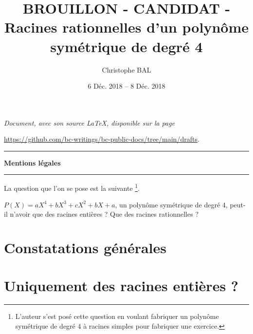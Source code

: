 \documentclass[12pt]{amsart}
\begin{document}
\title{BROUILLON - CANDIDAT - Racines rationnelles d'un polynôme symétrique de degré 4}
\author{Christophe BAL}
\date{6 Déc. 2018 -- 8 Déc. 2018}
\maketitle



\begin{center}
	\itshape
	Document, avec son source \LaTeX, disponible sur la page

	\url{https://github.com/bc-writings/bc-public-docs/tree/main/drafts}.
\end{center}


\bigskip


\begin{center}
	\hrule\vspace{.3em}
	{
		\fontsize{1.35em}{1em}\selectfont
		\textbf{Mentions \og légales \fg}
	}

	\vspace{0.45em}
	\doclicenseThis
	\hrule
\end{center}


\bigskip

La question que l'on se pose est la suivante
\footnote{
	L'auteur s'est posé cette question en voulant fabriquer un polynôme symétrique de degré $4$ à racines \og simples \fg{} pour fabriquer une exercice.
}.

\medskip

\begin{tcolorbox}
	$P(X) = a X^4 + b X^3 + c X^2 + b X + a$, un polynôme symétrique de degré 4, peut-il n'avoir que des racines entières ? Que des racines rationnelles ?
\end{tcolorbox}


\medskip
\setcounter{tocdepth}{1}
\tableofcontents



\section{Constatations générales}





\section{Uniquement des racines entières ?}


\end{document}
